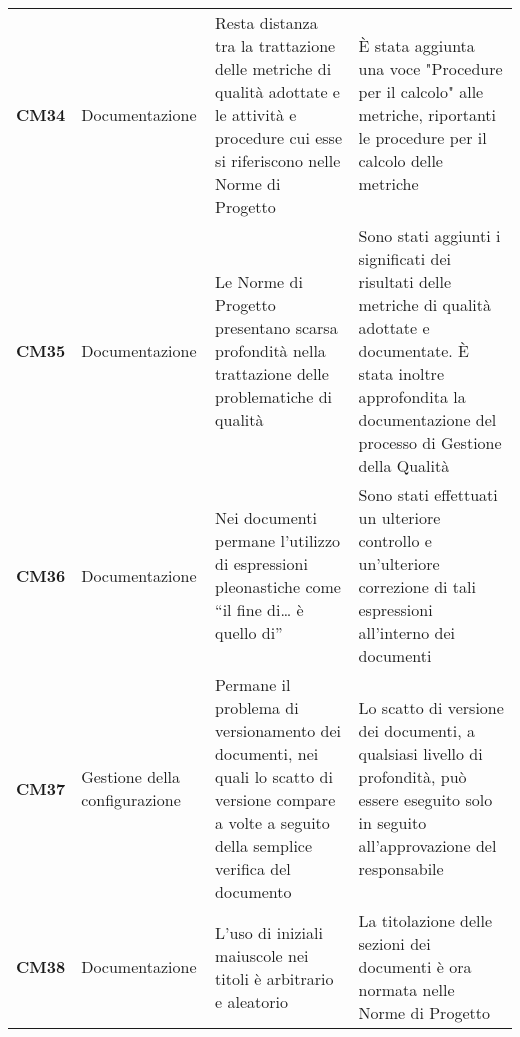 \documentclass[../piano-di-qualifica.tex]{subfiles}
\begin{document}
\begin{longtable}[H]{>{\centering\bfseries}m{2.5cm} >{\centering}m{2.5cm} >{\centering}m{5.5cm} >{\centering\arraybackslash}m{5.5cm}}
CM34 & Documentazione                                & Resta distanza tra la trattazione delle metriche di qualità adottate e le attività e procedure cui esse si riferiscono nelle Norme di Progetto                                & È stata aggiunta una voce "Procedure per il calcolo" alle metriche, riportanti le procedure per il calcolo delle metriche                                                                                                                                                                                                                           \\
CM35 & Documentazione                                & Le Norme di Progetto presentano scarsa profondità nella trattazione delle problematiche di qualità                                                                            & Sono stati aggiunti i significati dei risultati delle metriche di qualità adottate e documentate. È stata inoltre approfondita la documentazione del processo di Gestione della Qualità                                                                                                                                                             \\
CM36 & Documentazione                                & Nei documenti permane l’utilizzo di espressioni pleonastiche come “il fine di… è quello di”                                                                                   & Sono stati effettuati un ulteriore controllo e un’ulteriore correzione di tali espressioni all’interno dei documenti                                                                                                                                                                                                                                \\
CM37 & Gestione della configurazione                 & Permane il problema di versionamento dei documenti, nei quali lo scatto di versione compare a volte a seguito della semplice verifica del documento                           & Lo scatto di versione dei documenti, a qualsiasi livello di profondità, può essere eseguito solo in seguito all’approvazione del responsabile                                                                                                                                                                                                       \\
CM38 & Documentazione                                & L’uso di iniziali maiuscole nei titoli è arbitrario e aleatorio                                                                                                               & La titolazione delle sezioni dei documenti è ora normata nelle Norme di Progetto                                                                                                                                                                                                                                                                    \\

\end{longtable}
\end{document}
